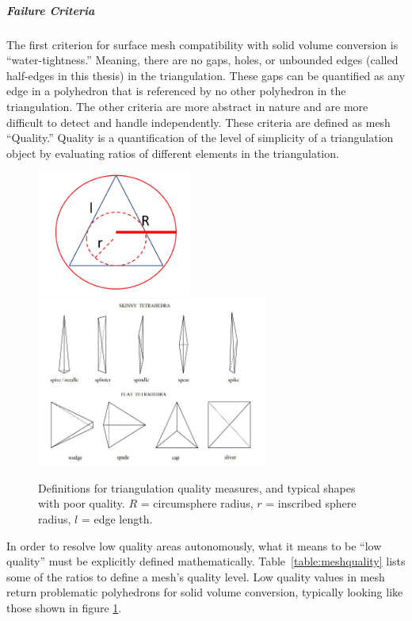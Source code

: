 \documentclass[12pt]{drexelthesis}
\begin{document}
\subparagraph{Failure Criteria}
The first criterion for surface mesh compatibility with solid volume conversion is “water-tightness.” Meaning, there are no gaps, holes, or unbounded edges (called half-edges in this thesis) in the triangulation. These gaps can be quantified as any edge in a polyhedron that is referenced by no other polyhedron in the triangulation.
The other criteria are more abstract in nature and are more difficult to detect and handle independently. These criteria are defined as mesh “Quality.” Quality is a quantification of the level of simplicity of a triangulation object by evaluating ratios of different elements in the triangulation.

\begin{figure}[!ht]
	\centering
		\includegraphics[width=2in]{triangulation_definitions.JPG}
		\includegraphics[width=3in]{bad_tetrahedra.JPG}
		\caption[Definitions for triangulation quality measures]
		{\centering Definitions for triangulation quality measures, and typical shapes with poor quality. $R$ = circumsphere radius, $r$ = inscribed sphere radius, $l$ = edge length.}
		\label{fig:meshquality}
\end{figure}

In order to resolve low quality areas autonomously, what it means to be ``low quality'' must be explicitly defined mathematically. Table~\ref{table:meshquality} lists some of the ratios to define a mesh's quality level. Low  quality  values  in  mesh  return  problematic  polyhedrons  for  solid volume  conversion,  typically  looking  like  those  shown  in  figure \ref{fig:meshquality}.
\end{document}
